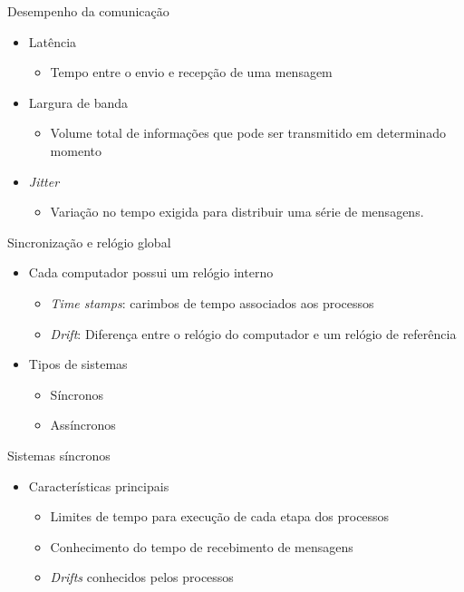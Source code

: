 \documentclass[aspectratio=169,
				xcolor=table]{beamer}
\begin{document}
	\begin{frame}{Desempenho da comunicação}
		\begin{itemize}
			\item Latência
			\begin{itemize}
				\item Tempo entre o envio e recepção de uma mensagem
			\end{itemize}
			\vspace{1em}
			\item Largura de banda
			\begin{itemize}
				\item Volume total de informações que pode ser transmitido em determinado momento
			\end{itemize}
			\item \textit{Jitter}
			\begin{itemize}
				\item Variação no tempo exigida para distribuir uma série de mensagens.
			\end{itemize}
		\end{itemize}
	\end{frame}
	
	\begin{frame}{Sincronização e relógio global}
		\begin{itemize}
			\item Cada computador possui um relógio interno
			\begin{itemize}
				\item \textit{Time stamps}: carimbos de tempo associados aos processos
				\item \textit{Drift}: Diferença entre o relógio do computador e um relógio de referência
			\end{itemize}
			\vspace{1em}
			\item Tipos de sistemas
			\begin{itemize}
				\item Síncronos
				\item Assíncronos
			\end{itemize}
		\end{itemize}
	\end{frame}
	
	\begin{frame}{Sistemas síncronos}
		\begin{itemize}
			\item Características principais
			\begin{itemize}
				\item Limites de tempo para execução de cada etapa dos processos
				\item Conhecimento do tempo de recebimento de mensagens
				\item \textit{Drifts} conhecidos pelos processos
			\end{itemize}
		\end{itemize}
	\end{frame}
	
\end{document}
